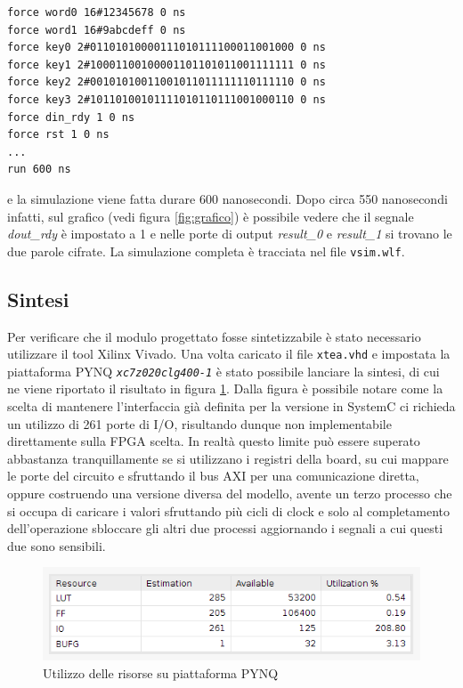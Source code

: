 \documentclass[]{IEEEtran}
\newcommand{\signal}[1]{\textit{#1}}
\newcommand{\code}[1]{\texttt{#1}}
\begin{document}
\begin{verbatim}
force word0 16#12345678 0 ns
force word1 16#9abcdeff 0 ns
force key0 2#01101010000111010111100011001000 0 ns
force key1 2#10001100100001101101011001111111 0 ns
force key2 2#00101010011001011011111110111110 0 ns
force key3 2#10110100101111010110111001000110 0 ns
force din_rdy 1 0 ns
force rst 1 0 ns
...
run 600 ns
\end{verbatim}
e la simulazione viene fatta durare 600 nanosecondi. Dopo circa 550 nanosecondi infatti, sul grafico (vedi figura 
\ref{fig:grafico}) \`e possibile vedere che il segnale \signal{dout\_rdy} \`e impostato a 1 e nelle porte di output 
\signal{result\_0} e \signal{result\_1} si trovano le due parole cifrate.
La simulazione completa è tracciata nel file \code{vsim.wlf}.

\subsection{Sintesi}
Per verificare che il modulo progettato fosse sintetizzabile \`e stato necessario utilizzare il tool Xilinx Vivado.
Una volta caricato il file \code{xtea.vhd} e impostata la piattaforma PYNQ \emph{\code{xc7z020clg400-1}} \`e stato 
possibile lanciare la sintesi, di cui ne viene riportato il risultato in figura \ref{fig:syn}. Dalla figura \`e 
possibile notare come la scelta di mantenere l'interfaccia gi\`a definita per la versione in SystemC ci richieda un 
utilizzo di 261 porte di I/O, risultando dunque non implementabile direttamente sulla FPGA scelta. In realt\`a questo 
limite pu\`o essere superato abbastanza tranquillamente se si utilizzano i registri della board, su cui mappare le porte
del circuito e sfruttando il bus AXI\cite{AXI} per una comunicazione diretta, oppure costruendo una versione diversa del
modello, avente un terzo processo che si occupa di caricare i valori sfruttando pi\`u cicli di clock e solo al 
completamento dell'operazione sbloccare gli altri due processi aggiornando i segnali a cui questi due sono sensibili.

\begin{figure}[tb]
	\centering
	\includegraphics[width=0.9\columnwidth]{figures/syn_res.png}
	\caption{Utilizzo delle risorse su piattaforma PYNQ}
	\label{fig:syn}
\end{figure}
\end{document}
